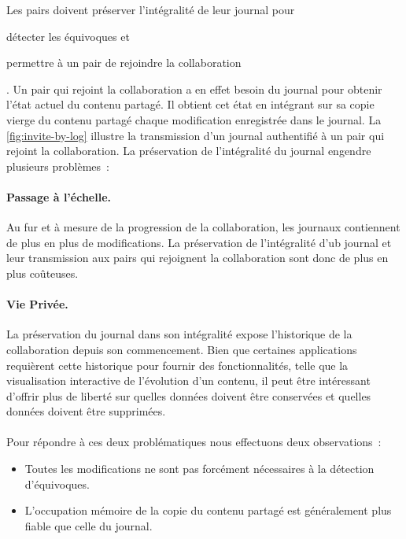 Les pairs doivent préserver l'intégralité de leur journal pour \begin{inlinelist}
\item détecter les équivoques et
\item permettre à un pair de rejoindre la collaboration
\end{inlinelist}.
Un pair qui rejoint la collaboration a en effet besoin du journal pour obtenir l'état actuel du contenu partagé.
Il obtient cet état en intégrant sur sa copie vierge du contenu partagé chaque modification enregistrée dans le journal.
La \autoref{fig:invite-by-log} illustre la transmission d'un journal authentifié à un pair qui rejoint la collaboration.
La préservation de l'intégralité du journal engendre plusieurs problèmes~:

\paragraph{Passage à l'échelle.} Au fur et à mesure de la progression de la collaboration, les journaux contiennent de plus en plus de modifications.
La préservation de l'intégralité d'ub journal et leur transmission aux pairs qui rejoignent la collaboration sont donc de plus en plus coûteuses.

\paragraph{Vie Privée.} La préservation du journal dans son intégralité expose l'historique de la collaboration depuis son commencement.
Bien que certaines applications requièrent cette historique pour fournir des fonctionnalités, telle que la visualisation interactive de l'évolution d'un contenu, il peut être intéressant d'offrir plus de liberté sur quelles données doivent être conservées et quelles données doivent être supprimées.

\paragraph{} Pour répondre à ces deux problématiques nous effectuons deux observations~:
\begin{itemize}
    \item Toutes les modifications ne sont pas forcément nécessaires à la détection d'équivoques.
    \item L'occupation mémoire de la copie du contenu partagé est généralement plus fiable que celle du journal.
\end{itemize}


